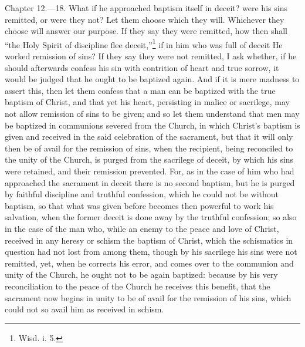 Chapter 12.—18. What if he approached baptism itself in deceit? were his sins remitted, or were they not? Let them choose which they will. Whichever they choose will answer our purpose. If they say they were remitted, how then shall ``the Holy Spirit of discipline flee deceit,''\footnote{\par  Wisd. i. 5.} if in him who was full of deceit He worked remission of sins? If they say they were not remitted, I ask whether, if he should afterwards confess his sin with contrition of heart and true sorrow, it would be judged that he ought to be baptized again. And if it is mere madness to assert this, then let them confess that a man can be baptized with the true baptism of Christ, and that yet his heart, persisting in malice or sacrilege, may not allow remission of sins to be given; and so let them understand that men may be baptized in communions severed from the Church, in which Christ’s baptism is given and received in the said celebration of the sacrament, but that it will only then be of avail for the remission of sins, when the recipient, being reconciled to the unity of the Church, is purged from the sacrilege of deceit, by which his sins were retained, and their remission prevented. For, as in the case of him who had approached the sacrament in deceit there is no second baptism, but he is purged by faithful discipline and truthful confession, which he could not be without baptism, so that what was given before becomes then powerful to work his salvation, when the former deceit is done away by the truthful confession; so also in the case of the man who, while an enemy to the peace and love of Christ, received in any heresy or schism the baptism of Christ, which the schismatics in question had not lost from among them, though by his sacrilege his sins were not remitted, yet, when he corrects his error, and comes over to the communion and unity of the Church, he ought not to be again baptized: because by his very reconciliation to the peace of the Church he receives this benefit, that the sacrament now begins in unity to be of avail for the remission of his sins, which could not so avail him as received in schism.

